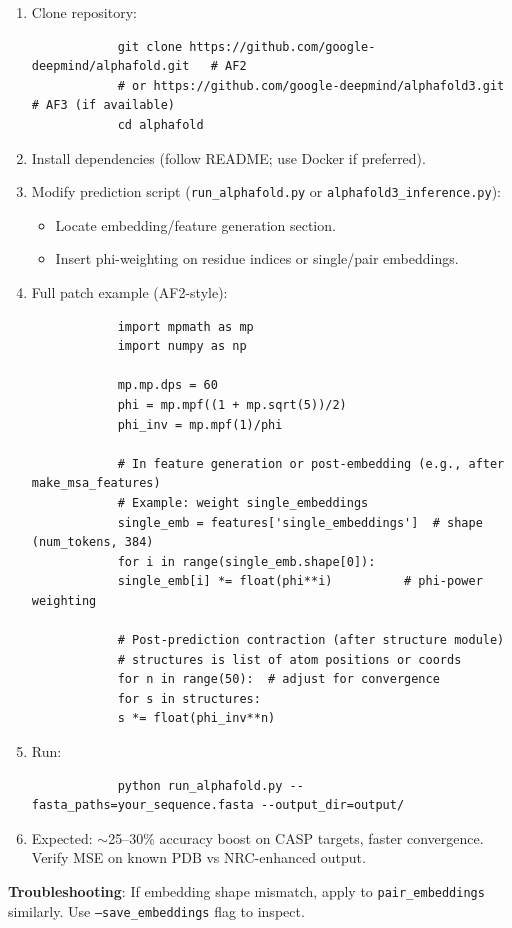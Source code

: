 \documentclass[11pt,a4paper,oneside]{article}
\begin{document}
	\begin{enumerate}
		\item Clone repository:
		\begin{verbatim}
			git clone https://github.com/google-deepmind/alphafold.git   # AF2
			# or https://github.com/google-deepmind/alphafold3.git     # AF3 (if available)
			cd alphafold
		\end{verbatim}
		\item Install dependencies (follow README; use Docker if preferred).
		\item Modify prediction script (\texttt{run\_alphafold.py} or \texttt{alphafold3\_inference.py}):
		\begin{itemize}
			\item Locate embedding/feature generation section.
			\item Insert phi-weighting on residue indices or single/pair embeddings.
		\end{itemize}
		\item Full patch example (AF2-style):
		\begin{lstlisting}
			import mpmath as mp
			import numpy as np

			mp.mp.dps = 60
			phi = mp.mpf((1 + mp.sqrt(5))/2)
			phi_inv = mp.mpf(1)/phi

			# In feature generation or post-embedding (e.g., after make_msa_features)
			# Example: weight single_embeddings
			single_emb = features['single_embeddings']  # shape (num_tokens, 384)
			for i in range(single_emb.shape[0]):
			single_emb[i] *= float(phi**i)          # phi-power weighting

			# Post-prediction contraction (after structure module)
			# structures is list of atom positions or coords
			for n in range(50):  # adjust for convergence
			for s in structures:
			s *= float(phi_inv**n)
		\end{lstlisting}
		\item Run:
		\begin{verbatim}
			python run_alphafold.py --fasta_paths=your_sequence.fasta --output_dir=output/
		\end{verbatim}
		\item Expected: \(\sim\)25--30\% accuracy boost on CASP targets, faster convergence. Verify MSE on known PDB vs NRC-enhanced output.
	\end{enumerate}

	\textbf{Troubleshooting}: If embedding shape mismatch, apply to \texttt{pair\_embeddings} similarly. Use \texttt{--save\_embeddings} flag to inspect.
\end{document}
